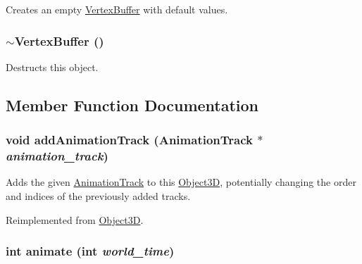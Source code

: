 Creates an empty \hyperlink{classm3g_1_1VertexBuffer}{VertexBuffer} with default values. \hypertarget{classm3g_1_1VertexBuffer_0e5e1dbdc4295ff9aa1e15e0ce3624af}{
\subsubsection[{$\sim$VertexBuffer}]{\setlength{\rightskip}{0pt plus 5cm}$\sim${\bf VertexBuffer} ()}}
\label{classm3g_1_1VertexBuffer_0e5e1dbdc4295ff9aa1e15e0ce3624af}


Destructs this object. 

\subsection{Member Function Documentation}
\hypertarget{classm3g_1_1VertexBuffer_415c0b110f95410ded9b85e5d99a496b}{
\subsubsection[{addAnimationTrack}]{\setlength{\rightskip}{0pt plus 5cm}void addAnimationTrack ({\bf AnimationTrack} $\ast$ {\em animation\_\-track})}}
\label{classm3g_1_1VertexBuffer_415c0b110f95410ded9b85e5d99a496b}


Adds the given \hyperlink{classm3g_1_1AnimationTrack}{AnimationTrack} to this \hyperlink{classm3g_1_1Object3D}{Object3D}, potentially changing the order and indices of the previously added tracks. 

Reimplemented from \hyperlink{classm3g_1_1Object3D_415c0b110f95410ded9b85e5d99a496b}{Object3D}.\hypertarget{classm3g_1_1VertexBuffer_8aad1ceab4c2a03609c8a42324ce484d}{
\subsubsection[{animate}]{\setlength{\rightskip}{0pt plus 5cm}int animate (int {\em world\_\-time})}}
\label{classm3g_1_1VertexBuffer_8aad1ceab4c2a03609c8a42324ce484d}


